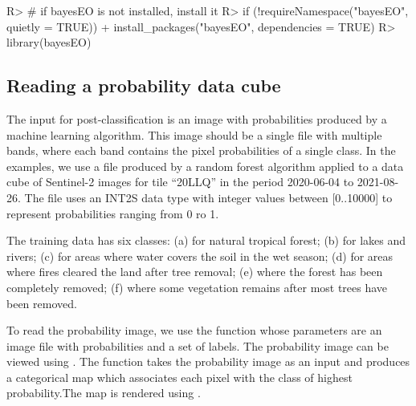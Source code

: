 \documentclass[
  shortnames]{jss}
\begin{document}
\begin{CodeChunk}
\begin{CodeInput}
R> # if bayesEO is not installed, install it
R> if (!requireNamespace("bayesEO", quietly = TRUE))
+           install_packages("bayesEO", dependencies = TRUE)
R> library(bayesEO)
\end{CodeInput}
\end{CodeChunk}

\subsection{Reading a probability data cube}\label{reading-a-probability-data-cube}

The input for post-classification is an image with probabilities produced by a machine learning algorithm. This image should be a single file with multiple bands, where each band contains the pixel probabilities of a single class. In the examples, we use a file produced by a random forest algorithm applied to a data cube of Sentinel-2 images for tile ``20LLQ'' in the period 2020-06-04 to 2021-08-26. The file uses an INT2S data type with integer values between {[}0..10000{]} to represent probabilities ranging from 0 ro 1.

The training data has six classes: (a)  for natural tropical forest; (b)  for lakes and rivers; (c)  for areas where water covers the soil in the wet season; (d)  for areas where fires cleared the land after tree removal; (e)  where the forest has been completely removed; (f)  where some vegetation remains after most trees have been removed.

To read the probability image, we use the function  whose parameters are an image file with probabilities and a set of labels. The probability image can be viewed using . The function  takes the probability image as an input and produces a categorical map which associates each pixel with the class of highest probability.The map is rendered using .
\end{document}
